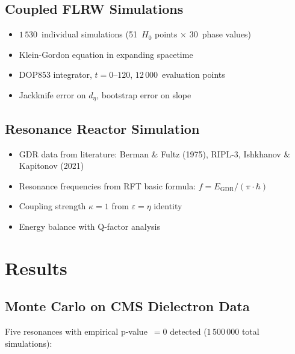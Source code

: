 \documentclass[a4paper,11pt]{article}
\begin{document}
	\subsection{Coupled FLRW Simulations}
	
	\begin{itemize}
		\item $1\,530$~individual simulations
		(51~$H_0$ points $\times$ 30~phase values)
		\item Klein-Gordon equation in expanding spacetime
		\item DOP853 integrator, $t = 0$--$120$,
		$12\,000$~evaluation points
		\item Jackknife error on $d_\eta$,
		bootstrap error on slope
	\end{itemize}
	
	\subsection{Resonance Reactor Simulation}
	
	\begin{itemize}
		\item GDR data from literature:
		Berman \& Fultz (1975), RIPL-3,
		Ishkhanov \& Kapitonov (2021)
		\item Resonance frequencies from RFT basic formula:
		$f = E_{\mathrm{GDR}} / (\pi \cdot \hbar)$
		\item Coupling strength $\kappa = 1$ from
		$\varepsilon = \eta$ identity
		\item Energy balance with Q-factor analysis
	\end{itemize}
	
	\section{Results}
	
	\subsection{Monte Carlo on CMS Dielectron Data}
	
	Five resonances with empirical p-value~$= 0$ detected
	($1\,500\,000$ total simulations):
	
\end{document}
